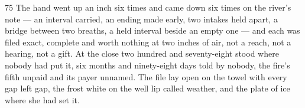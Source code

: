 \begin{CRchronicle}{75}
The hand went up an inch six times and came down six times on the river’s note — an interval carried, an ending made early, two intakes held apart, a bridge between two breaths, a held interval beside an empty one — and each was filed exact, complete and worth nothing at two inches of air, not a reach, not a hearing, not a gift. At the close two hundred and seventy-eight stood where nobody had put it, six months and ninety-eight days told by nobody, the fire’s fifth unpaid and its payer unnamed. The file lay open on the towel with every gap left gap, the frost white on the well lip called weather, and the plate of ice where she had set it.
\end{CRchronicle}
